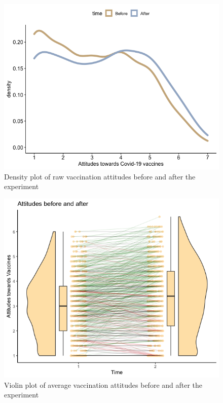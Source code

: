 \documentclass[
  english,
  ,jou,floatsintext]{apa6}
\begin{document}
\begin{figure}

{\centering \includegraphics[width=1\linewidth]{../plots/raw_density} 

}

\caption{Density plot of raw vaccination attitudes before and after the experiment}\label{fig:rawdensity}
\end{figure}

\begin{figure}

{\centering \includegraphics[width=1\linewidth]{../plots/before_and_after_violin} 

}

\caption{Violin plot of average vaccination attitudes before and after the experiment}\label{fig:beforeafter}
\end{figure}
\end{document}
